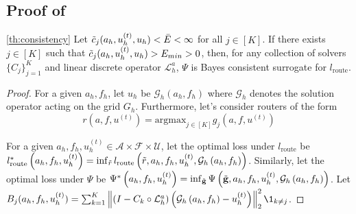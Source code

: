 \documentclass{article} %
\begin{document}
\subsection{Proof of } \label{sec:proofconsistency}

\begin{customtheorem}{\ref{th:consistency}}
    Let $\Tilde{c}_j(a_h, u^{(t)}_h, u_h) < \Bar{E} < \infty$  for all $j \in [K]$. If there exists $j\in [K]$ such that $\Tilde{c}_j(a_h, u^{(t)}_h, u_h) > E_{min} > 0$, then, for any collection of solvers $\{C_j\}_{j= 1}^K$ and linear discrete operator $\mathcal{L}_h^a$, $\Psi$ is Bayes consistent surrogate for $l_{\text{route}}$.
\end{customtheorem}

\begin{proof}

For a given $a_h, f_h$, let $u_h$ be $\mathcal{G}_h\left(a_h, f_h\right)$ where $\mathcal{G}_h$ denotes the solution operator acting on the grid $G_h$. Furthermore, let's consider routers of the form $$r(a, f, u^{(t)}) = \text{argmax}_{j \in [K]} g_j(a, f, u^{(t)})$$

For a given $a_h, f_h, u_h^{(t)} \in \mathcal{A} \times \mathcal{F} \times \mathcal{U}$, let the optimal loss under $l_{\text{route}}$ be $l_{\text{route}}^*\left(a_h, f_h, u^{(t)}_h\right) = \inf_{\Tilde{r}} l_{\text{route}}\left(\tilde{r}, a_h, f_h, u^{(t)}_h, \mathcal{G}_h\left(a_h, f_h\right)\right)$. Similarly, let the optimal loss under $\Psi$ be $\Psi^*\left(a_h, f_h, u^{(t)}_h\right) = \inf_{\Tilde{\mathbf{g}}} \Psi\left(\tilde{\mathbf{g}}, a_h, f_h, u^{(t)}_h, \mathcal{G}_h\left(a_h, f_h\right)\right)$. Let $B_j(a_h, f_h, u^{(t)}_h) = \sum_{k = 1}^K\left\|\left( I - C_{k} \circ \mathcal{L}_{h}^a\right)\left(\mathcal{G}_h\left(a_h, f_h\right) - u^{(t)}_h\right)\right\|^2_2\1_{k\neq j}$.


\end{proof}
\end{document}
